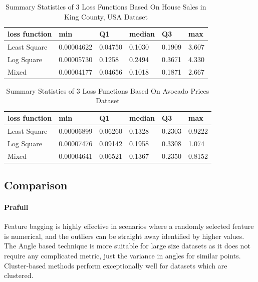 \documentclass[runningheads]{llncs}
\begin{document}
\begin{table}[h]
\begin{center}
\begin{tabular}{|l|l|l|l|l|l|}
\hline
loss function & min & Q1 & median & Q3 & max \\ \hline
Least Square & 0.00004622 & 0.04750 & 0.1030 & 0.1909 & 3.607 \\ \hline
Log Square & 0.00005730 & 0.1258 & 0.2494 & 0.3671 & 4.330 \\ \hline
Mixed & 0.00004177 & 0.04656 & 0.1018 & 0.1871 & 2.667 \\ \hline
\end{tabular}
\end{center}
\caption{Summary Statistics of 3 Loss Functions Based On House Sales in King County, USA Dataset}\label{summary-statistics-3-functions-k3}
\end{table}


\begin{table}[h]
\begin{center}
\begin{tabular}{|l|l|l|l|l|l|}
\hline
loss function & min & Q1 & median & Q3 & max \\ \hline
Least Square & 0.00006899 & 0.06260 & 0.1328 & 0.2303 & 0.9222 \\ \hline
Log Square & 0.00007476 & 0.09142 & 0.1958 & 0.3308 & 1.074 \\ \hline
Mixed & 0.00004641 & 0.06521 & 0.1367 & 0.2350 & 0.8152 \\ \hline
\end{tabular}
\end{center}
\caption{Summary Statistics of 3 Loss Functions Based On Avocado Prices Dataset}\label{summary-statistics-3-functions-k1}
\end{table}


\subsection{Comparison}
\paragraph{Prafull} Feature bagging is highly effective in scenarios where a randomly selected feature is numerical, and the outliers can be straight away identified by higher values. The Angle based technique is more suitable for large size datasets as it does not require any complicated metric, just the variance in angles for similar points. Cluster-based methods perform exceptionally well for datasets which are clustered.
\end{document}
